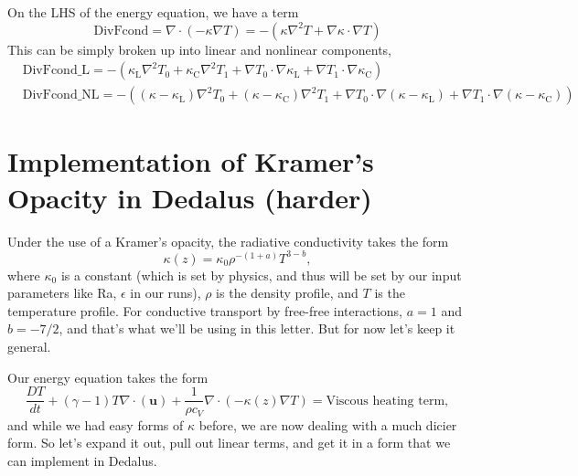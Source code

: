 \documentclass[aps, pre, onecolumn, nofootinbib, notitlepage, groupedaddress, amsfonts, amssymb, amsmath, longbibliography]{revtex4-1}
\newcommand{\Div}[1]{\ensuremath{\nabla\cdot\left( #1\right)}}
\newcommand{\grad}{\ensuremath{\nabla}}
\begin{document}
On the LHS of the energy equation, we have a term
\begin{equation}
\text{DivFcond} = \Div{-\kappa\grad T} 
= -(\kappa\grad^2 T + \grad \kappa\cdot\grad T)
\end{equation}
This can be simply broken up into linear and nonlinear components,
\begin{equation}
\begin{split}
&\text{DivFcond\_L} = -\left(\kappa_\text{L}\grad^2 T_0 
+ \kappa_\text{C} \grad^2 T_1 
+ \grad T_0 \cdot \grad \kappa_\text{L}
+ \grad T_1 \cdot \grad \kappa_\text{C}\right) \\
&\text{DivFcond\_NL} = -\left(
(\kappa - \kappa_\text{L})\grad^2 T_0
+ (\kappa - \kappa_\text{C})\grad^2 T_1
+ \grad T_0 \cdot \grad(\kappa - \kappa_\text{L}) 
+ \grad T_1 \cdot \grad(\kappa - \kappa_\text{C}) \right)
\end{split}
\end{equation}



\section{Implementation of Kramer's Opacity in Dedalus (harder)}
\label{sec:intro}
Under the use of a Kramer's opacity, the radiative conductivity takes the form
\begin{equation}
\kappa(z) = \kappa_0 \rho^{-(1 + a)} T^{3 - b},
\end{equation}
where $\kappa_0$ is a constant (which is set by physics, and thus will be
set by our input parameters like Ra, $\epsilon$ in our runs), $\rho$
is the density profile, and $T$ is the temperature profile. For
conductive transport by free-free interactions, $a = 1$ and $b = -7/2$,
and that's what we'll be using in this letter. But for now let's keep
it general.

Our energy equation takes the form
\begin{equation}
\frac{D T}{d t} + (\gamma-1)T\Div{\bm{u}} 
 + \frac{1}{\rho c_V}\Div{-\kappa(z) \grad T} = \text{Viscous heating term},
\end{equation}
and while we had easy forms of $\kappa$ before, we are now dealing with a much
dicier form. So let's expand it out, pull out linear terms, and get it in a
form that we can implement in Dedalus.
\end{document}
